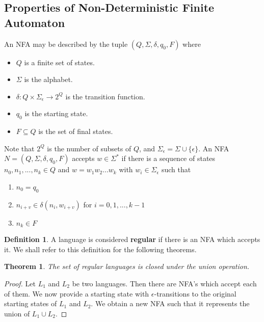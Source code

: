 \documentclass[11pt]{article}
\theoremstyle{plain} %
\newtheorem*{theorem}{Theorem}
\theoremstyle{definition}
\newtheorem*{definition}{Definition} %
\theoremstyle{example}
\theoremstyle{remark}
\begin{document}
\subsection{Properties of Non-Deterministic Finite Automaton}
An NFA may be described by the tuple $(Q, \Sigma, \delta, q_0, F)$ where

\begin{itemize}
	\item $Q$ is a finite set of states.
	\item $\Sigma$ is the alphabet.
	\item $\delta:Q \times \Sigma_{\epsilon} \rightarrow
	 2^Q$ is the transition function.
	\item $q_0$ is the starting state.
	\item $F \subseteq Q$ is the set of final states. 
\end{itemize} 


Note that $2^Q$ is the number of subsets of $Q$, and $\Sigma_{\epsilon} = \Sigma \cup \{ \epsilon \}$. An NFA $N=(Q, \Sigma, \delta, q_0, F)$ accepts $w \in \Sigma^*$ if there is a sequence of states $n_0, n_1,...,n_k \in Q$ and $w = w_1w_2...w_k$ with $w_i \in \Sigma_{\epsilon}$ such that 

\begin{enumerate}
	\item $n_0 = q_0$
	\item $n_{i+v} \in \delta(n_i, w_{i+v})$ for $i = 0,1,...,k-1$
	\item $n_k \in F$
\end{enumerate}

\begin{definition}
A language is considered \textbf{regular} if there is an NFA which accepts it. We shall refer to this definition for the following theorems.

\end{definition}

\begin{theorem}
The set of regular languages is closed under the union operation. \end{theorem}

\begin{proof}
Let $L_1$ and $L_2$ be two languages. Then there are NFA's which accept each of them. We now provide a starting state with $\epsilon$-transitions to the original starting states of $L_1$ and $L_2$. We obtain a new NFA such that it represents the union of $L_1 \cup L_2$. 
\end{proof}
\end{document}
